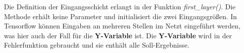 Die Definition der Eingangsschicht erlangt in der Funktion
\emph{first\_layer()}. Die Methode erhält keine Parameter und
initialisiert die zwei Eingangsgrößen. In Tensorflow können Eingaben an
mehreren Stellen im Netzt eingeführt werden, was hier auch der Fall für
die \textbf{Y-Variable} ist. Die \textbf{Y-Variable} wird in der
Fehlerfunktion gebraucht und sie enthält alle Soll-Ergebnisse.
%
